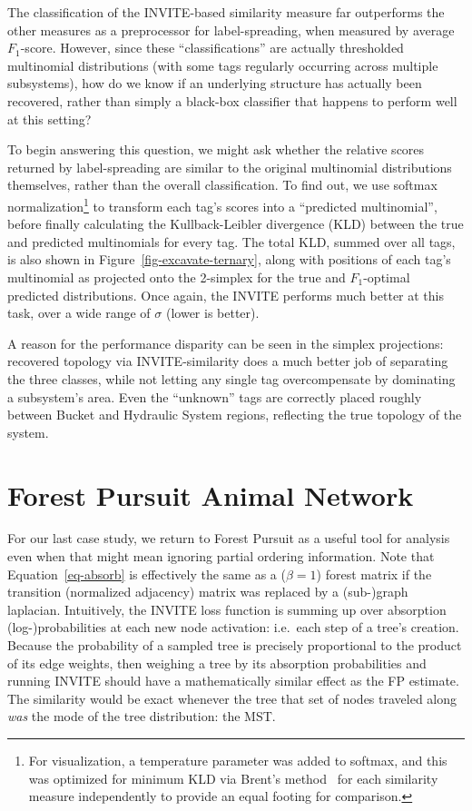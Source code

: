 \documentclass[%
	12pt,
		oneside,
		letterpaper
]{book}
\begin{document}
The classification of the INVITE-based similarity measure far outperforms the other measures as a preprocessor for label-spreading, when measured by average \(F_1\)-score.
However, since these ``classifications'' are actually thresholded multinomial distributions (with some tags regularly occurring across multiple subsystems), how do we know if an underlying structure has actually been recovered, rather than simply a black-box classifier that happens to perform well at this setting?

To begin answering this question, we might ask whether the relative scores returned by label-spreading are similar to the original multinomial distributions themselves, rather than the overall classification.
To find out, we use softmax normalization\footnote{For visualization, a temperature parameter was added to softmax, and this was optimized for minimum KLD via Brent's method~\autocite{algorithmguaranteedconvergence_Brent1971} for each similarity measure independently to provide an equal footing for comparison.}
to transform each tag's scores into a ``predicted multinomial'', before finally calculating the Kullback-Leibler divergence (KLD) between the true and predicted multinomials for every tag.
The total KLD, summed over all tags, is also shown in Figure~\ref{fig-excavate-ternary}, along with positions of each tag's multinomial as projected onto the 2-simplex for the true and \(F_1\)-optimal predicted distributions.
Once again, the INVITE performs much better at this task, over a wide range of \(\sigma\) (lower is better).

A reason for the performance disparity can be seen in the simplex projections: recovered topology via INVITE-similarity does a much better job of separating the three classes, while not letting any single tag overcompensate by dominating a subsystem's area.
Even the ``unknown'' tags are correctly placed roughly between Bucket and Hydraulic System regions, reflecting the true topology of the system.

\section{Forest Pursuit Animal Network}\label{sec-animal-fluency}

For our last case study, we return to Forest Pursuit as a useful tool for analysis even when that might mean ignoring partial ordering information.
Note that Equation~\ref{eq-absorb} is effectively the same as a (\(\beta=1\)) forest matrix if the transition (normalized adjacency) matrix was replaced by a (sub-)graph laplacian.
Intuitively, the INVITE loss function is summing up over absorption (log-)probabilities at each new node activation: i.e.~each step of a tree's creation.
Because the probability of a sampled tree is precisely proportional to the product of its edge weights, then weighing a tree by its absorption probabilities and running INVITE should have a mathematically similar effect as the FP estimate.
The similarity would be exact whenever the tree that set of nodes traveled along \emph{was} the mode of the tree distribution: the MST.
\end{document}
